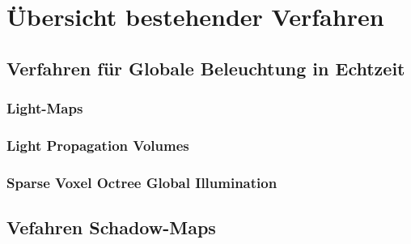 \chapter{Übersicht bestehender Verfahren}

\blindtext

\section{Verfahren für Globale Beleuchtung in Echtzeit}

\subsection{Light-Maps}
\blindtext

\subsection{Light Propagation Volumes}
\blindtext

\subsection{Sparse Voxel Octree Global Illumination}
\blindtext

\section{Vefahren Schadow-Maps}
\blindtext